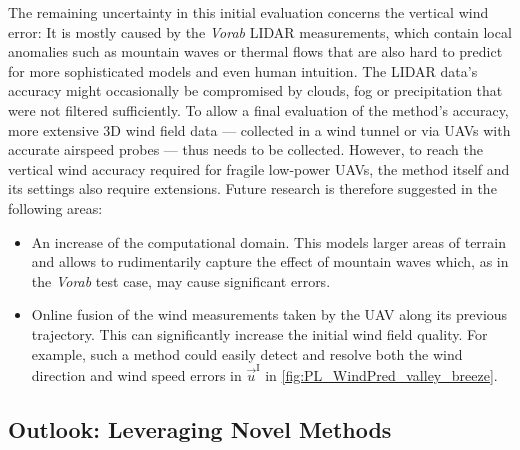 \documentclass[twocolumn,letterpaper]{IEEEAerospaceCLS}
\begin{document}
The remaining uncertainty in this initial evaluation concerns the vertical wind error: It is mostly caused by the \emph{Vorab} LIDAR measurements, which contain local anomalies such as mountain waves or thermal flows that are also hard to predict for more sophisticated models and even human intuition. The LIDAR data's accuracy might occasionally be compromised by clouds, fog or precipitation that were not filtered sufficiently. To allow a final evaluation of the method's accuracy, more extensive 3D wind field data --- collected in a wind tunnel or via UAVs with accurate airspeed probes --- thus needs to be collected. However, to reach the vertical wind accuracy required for fragile low-power UAVs, the method itself and its settings also require extensions. Future research is therefore suggested in the following areas: 
\begin{itemize}
\item An increase of the computational domain. This models larger areas of terrain and allows to rudimentarily capture the effect of mountain waves which, as in the \emph{Vorab} test case, may cause significant errors.
\item Online fusion of the wind measurements taken by the UAV along its previous trajectory. This can significantly increase the initial wind field quality. For example, such a method could easily detect and resolve both the wind direction and wind speed errors in $\vec{u}^\text{I}$ in \cref{fig:PL_WindPred_valley_breeze}.
\end{itemize}

\subsection{Outlook: Leveraging Novel Methods}
\end{document}
